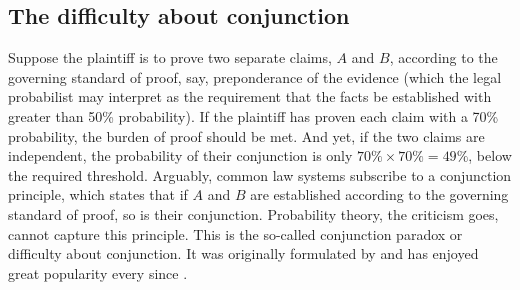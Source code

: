 \documentclass{article}
\begin{document}



\subsection{The difficulty about conjunction}

\label{subsec:conj}


Suppose the plaintiff is to prove two separate claims, $A$ and $B$, according to the governing standard of proof, say, preponderance of the evidence (which the legal probabilist may interpret as the requirement that the facts be established with greater than 50\% probability). If the plaintiff has proven each claim with a 70\%  probability, the burden of proof should be met. And yet, if the two claims are independent, the probability of their conjunction is only $70\%\times70\%=49\%$, below the required threshold.  %
Arguably, common law systems subscribe to a conjunction principle, which states that if $A$ and $B$ are established according to the governing standard of proof, so is their conjunction. Probability theory, the criticism goes, cannot capture this principle. This is the so-called conjunction paradox or difficulty about conjunction. It was originally formulated by \cite{Cohen1977The-probable-an} and has enjoyed great popularity every since \citep{Allen1986A-Reconceptuali,Stein2005Foundations-of-,allen2013,haack2011legal,schwartz2017ConjunctionProblemLogic,AllenPardo2019relative}. 
\end{document}
